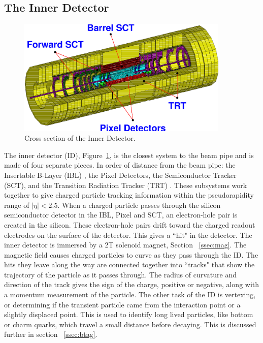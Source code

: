 \subsection{The Inner Detector}
\begin{figure}[h]
\begin{center}
\includegraphics*[width=0.90\textwidth] {figures/inner_3D}%
\caption[Cross section of the Inner Detector]{Cross section of the Inner Detector.}
\label{fig:ID_cs}
\end{center}
\end{figure}
%
%
The inner detector (ID), Figure~\ref{fig:ID_cs}, is the closest system to the beam pipe and is made of four separate pieces. In order of distance from the beam pipe: the Insertable B-Layer (IBL) \cite{Capeans:1291633}, the Pixel Detectors, the Semiconductor Tracker (SCT), and the Transition Radiation Tracker (TRT) \cite{CERN-LHCC-97-016}. These subsystems work together to give charged particle tracking information within the pseudorapidity range of ${|\eta| < 2.5}$. When a charged particle passes through the silicon semiconductor detector in the IBL, Pixel and SCT, an electron-hole pair is created in the silicon. These electron-hole pairs drift toward the charged readout electrodes on the surface of the detector. This gives a ``hit" in the detector. The inner detector is immersed by a 2T solenoid magnet, Section ~\ref{ssec:mag}. The magnetic field causes charged particles to curve as they pass through the ID. The hits they leave along the way are connected together into ``tracks" that show the trajectory of the particle as it passes through. The radius of curvature and direction of the track gives the sign of the charge, positive or negative, along with a momentum measurement of the particle. The other task of the ID is vertexing, or determining if the transient particle came from the interaction point or a slightly displaced point. This is used to identify long lived particles, like bottom or charm quarks, which travel a small distance before decaying. This is discussed further in section ~\ref{ssec:btag}. \newline
